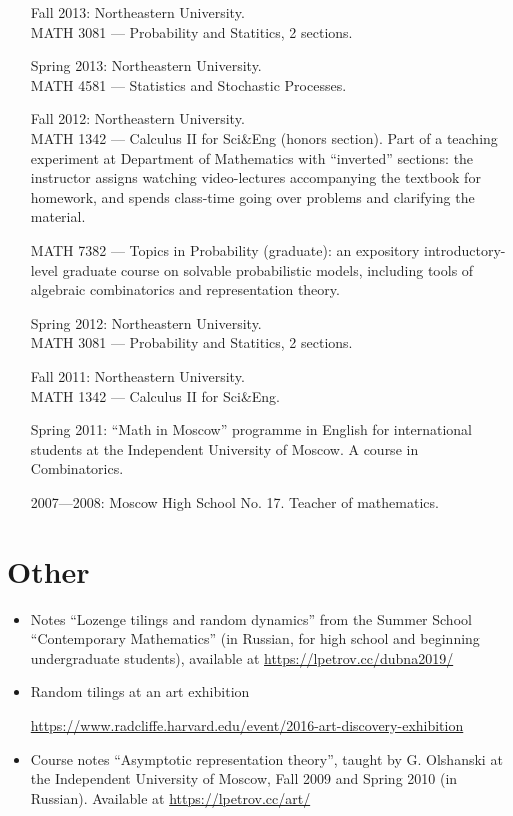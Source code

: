 \documentclass[letterpaper,11pt]{article}
\begin{document}
\begin{itemize}
	\item
	      [Fall 2013:]
	      Northeastern University. \\ MATH 3081 --- Probability and
	      Statitics, 2 sections.
	\item
	      [Spring 2013:]
	      Northeastern University. \\ MATH 4581 --- Statistics and
	      Stochastic Processes.
	\item
	      [Fall 2012:]
	      Northeastern University. \\ MATH 1342 --- Calculus II for
	      Sci\&Eng (honors section). Part of a teaching experiment at Department of
	      Mathematics with ``inverted'' sections: the instructor assigns watching
	      video-lectures accompanying the textbook for homework, and spends class-time
	      going over problems and clarifying the material.

	      MATH 7382 --- Topics in Probability (graduate): an expository
	      introductory-level graduate course on solvable probabilistic models, including
	      tools of algebraic combinatorics and representation theory.

	\item
	      [Spring 2012:]
	      Northeastern University. \\ MATH 3081 --- Probability and
	      Statitics, 2 sections.
	\item
	      [Fall 2011:]
	      Northeastern University.\\ MATH 1342 --- Calculus II for
	      Sci\&Eng.
	\item
	      [Spring 2011:]
	      ``Math in Moscow'' programme in English for international
	      students at the Independent University of Moscow. A course in
	      Combinatorics.

	\item
	      [2007---2008:]
	      Moscow High School No. 17. Teacher of mathematics.
\end{itemize}

\section*{Other}

\begin{itemize}
	\item
	Notes ``Lozenge tilings and random dynamics'' from the 
	Summer School ``Contemporary Mathematics'' (in Russian, for 
	high school and beginning undergraduate students), 
	available at
	\url{https://lpetrov.cc/dubna2019/}

	\item
	Random tilings at an art exhibition

	\url{https://www.radcliffe.harvard.edu/event/2016-art-discovery-exhibition}
	\item
	Course notes 
	``Asymptotic representation theory'',
	taught by G. Olshanski 
	at the Independent University of Moscow,
	Fall 2009 and Spring 2010 (in Russian). 
	Available at \url{https://lpetrov.cc/art/}

\end{itemize}
\end{document}

